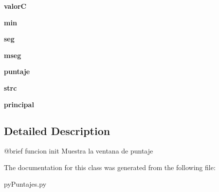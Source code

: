 \begin{DoxyCompactItemize}
\item 
\hypertarget{classpy_puntajes_1_1_myform_puntaje_a5d14fae0189ad9ab4b388814d6a1059b}{{\bfseries valor\-C}}\label{classpy_puntajes_1_1_myform_puntaje_a5d14fae0189ad9ab4b388814d6a1059b}

\item 
\hypertarget{classpy_puntajes_1_1_myform_puntaje_af581fe4c19624a75a8929ad70d8dd7a2}{{\bfseries min}}\label{classpy_puntajes_1_1_myform_puntaje_af581fe4c19624a75a8929ad70d8dd7a2}

\item 
\hypertarget{classpy_puntajes_1_1_myform_puntaje_a8d5cf012b41f172b5a123c0b86106cb0}{{\bfseries seg}}\label{classpy_puntajes_1_1_myform_puntaje_a8d5cf012b41f172b5a123c0b86106cb0}

\item 
\hypertarget{classpy_puntajes_1_1_myform_puntaje_a8a0076112eab8b0579a2f69c38d7de41}{{\bfseries mseg}}\label{classpy_puntajes_1_1_myform_puntaje_a8a0076112eab8b0579a2f69c38d7de41}

\item 
\hypertarget{classpy_puntajes_1_1_myform_puntaje_a7d1817b346dacfed67ee8473a5424c78}{{\bfseries puntaje}}\label{classpy_puntajes_1_1_myform_puntaje_a7d1817b346dacfed67ee8473a5424c78}

\item 
\hypertarget{classpy_puntajes_1_1_myform_puntaje_ae7244b25eaeb79977827f7acbacf3fb8}{{\bfseries strc}}\label{classpy_puntajes_1_1_myform_puntaje_ae7244b25eaeb79977827f7acbacf3fb8}

\item 
\hypertarget{classpy_puntajes_1_1_myform_puntaje_a61090f0911b38c693f23d928780a32cd}{{\bfseries principal}}\label{classpy_puntajes_1_1_myform_puntaje_a61090f0911b38c693f23d928780a32cd}

\end{DoxyCompactItemize}


\subsection{Detailed Description}
\begin{DoxyVerb}@brief funcion init
Muestra la ventana de puntaje
\end{DoxyVerb}
 

The documentation for this class was generated from the following file\-:\begin{DoxyCompactItemize}
\item 
py\-Puntajes.\-py\end{DoxyCompactItemize}
